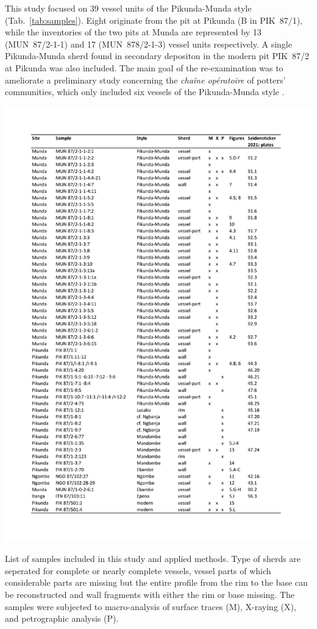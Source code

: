 \documentclass[smallextended,natbib]{svjour3}       %
\begin{document}
This study focused on 39 vessel units of the Pikunda-Munda style (Tab.~\ref{tab:samples}). Eight originate from the pit at Pikunda (B in PIK~87/1), while the inventories of the two pits at Munda are represented by 13 (MUN~87/2-1-1) and 17 (MUN~878/2-1-3) vessel units respectively. A single Pikunda-Munda sherd found in secondary depositon in the modern pit PIK~87/2 at Pikunda was also included. The main goal of the re-examination was to ameliorate a preliminary study concerning the \textit{chaîne opératoire} of potters' communities, which only included six vessels of the Pikunda-Munda style \citep[45--73]{Seidensticker.2021e}.

\begin{table}[p]
	\centering
	\includegraphics[height=.88\textheight]{Tab_Samples.pdf}
	\caption{List of samples included in this study and applied methods. Type of sherds are seperated for complete or nearly complete vessels, vessel parts of which considerable parts are missing but the entire profile from the rim to the base can be reconstructed and wall fragments with either the rim or base missing. The samples were subjected to macro-analysis of surface traces (M), X-raying (X), and petrographic analysis (P).}
	\label{tab:samples}	
\end{table}
\end{document}
